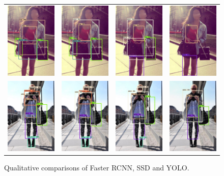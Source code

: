 \begin{figure}[H]
\begin{tabular}{cccc}
		\includegraphics[width=.11\textwidth]{./figures/detection/0120462_0_5_gt_b.jpg} & 
		\includegraphics[width=.11\textwidth]{./figures/detection/faster_0120462_0_5_det_b.jpg} &
		\includegraphics[width=.11\textwidth]{./figures/detection/ssd_0120462_0_5_det_b.jpg} &
		\includegraphics[width=.11\textwidth]{./figures/detection/yolo_0120462_0_5_det_b.jpg}\\
		
		\includegraphics[width=.11\textwidth]{./figures/detection/0124208_0_5_gt_b.jpg} & 
		\includegraphics[width=.11\textwidth]{./figures/detection/faster_0124208_0_5_det_b.jpg} &
		\includegraphics[width=.11\textwidth]{./figures/detection/ssd_0124208_0_5_det_b.jpg} &
		\includegraphics[width=.11\textwidth]{./figures/detection/yolo_0124208_0_5_det_b.jpg}\\
	\end{tabular}
	\caption{Qualitative comparisons of Faster RCNN, SSD and YOLO.}
	\label{fig:detection-qual} %
\end{figure}


